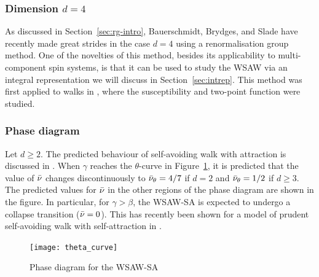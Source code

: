 \subsubsection{Dimension $d = 4$}

As discussed in Section~\ref{sec:rg-intro}, Bauerschmidt, Brydges, and Slade have
recently made great strides in the case $d = 4$ using a renormalisation group method.
One of the novelties of this method, besides its applicability to multi-component
spin systems, is that it can be used to study the WSAW via an integral representation
we will discuss in Section~\ref{sec:intrep}. This method was first applied to walks
in \cite{BBS-saw4-log,BBS-saw4}, where the susceptibility and two-point function were
studied.

\subsubsection{Phase diagram}

Let $d \ge 2$. The predicted behaviour of self-avoiding walk with attraction is discussed
in \cite{Vand98}.
When $\gamma$ reaches the $\theta$-curve in Figure~\ref{fig:theta-curve}, it is predicted
that the value of $\bar\nu$ changes discontinuously to $\bar\nu_\theta = 4/7$ if $d = 2$
and $\bar\nu_\theta = 1/2$ if $d \ge 3$. The predicted values for $\bar\nu$
in the other regions of the phase diagram are shown in the figure. In particular, for
$\gamma > \beta$, the WSAW-SA is expected to undergo a collapse transition ($\bar\nu = 0$).
This has recently been shown for a model of prudent self-avoiding walk with self-attraction
in \cite{PT16}.

\begin{figure}
\centering
\texttt{[image: theta\_curve]}
\caption[Phase diagram of WSAW-SA]{Phase diagram for the WSAW-SA}
\label{fig:theta-curve}
\end{figure}
